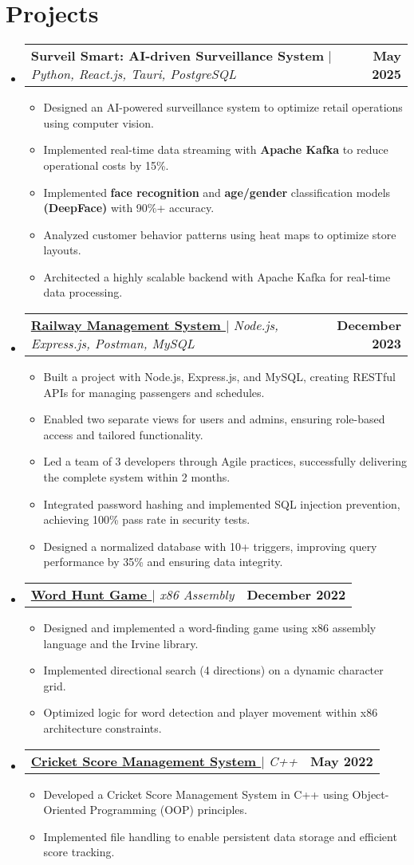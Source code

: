\documentclass[letterpaper,11pt]{article}
\makeatletter
\newcommand{\resumeItem}[1]{
  \item\small{
    {#1 \vspace{-2pt}}
  }
}
\newcommand{\resumeProjectHeading}[2]{
    \item
    \begin{tabular*}{1.001\textwidth}{l@{\extracolsep{\fill}}r}
      \small#1 & \textbf{\small #2}\\
    \end{tabular*}\vspace{-7pt}
}
\newcommand{\sectionspace}{\vspace{-10pt}}
\newcommand{\resumeSubHeadingListStart}{\begin{itemize}[leftmargin=0.0in, label={}]}
\newcommand{\resumeSubHeadingListEnd}{\end{itemize}}
\newcommand{\resumeItemListStart}{\begin{itemize}}
\newcommand{\resumeItemListEnd}{\end{itemize}\vspace{-5pt}}
\makeatother
\begin{document}
\section{Projects}
    \vspace{-5pt}
    \resumeSubHeadingListStart
    \resumeProjectHeading
          {\textbf{Surveil Smart: AI-driven Surveillance System} $|$ \emph{Python, React.js, Tauri, PostgreSQL}}{May 2025}
          \resumeItemListStart
            \resumeItem{Designed an AI-powered surveillance system to optimize retail operations using computer vision.}
            \resumeItem{Implemented real-time data streaming with \textbf{Apache Kafka} to reduce operational costs by 15\%.}
            \resumeItem{Implemented \textbf{face recognition} and \textbf{age/gender} classification models \textbf{(DeepFace)} with 90\%+ accuracy.}
            \resumeItem{Analyzed customer behavior patterns using heat maps to optimize store layouts.}
            \resumeItem{Architected a highly scalable backend with Apache Kafka for real-time data processing.}
          \resumeItemListEnd
          \vspace{-13pt}
    \resumeProjectHeading
          {\textbf{\href{https://github.com/mwarsi2784/Railway-Management-System}{Railway Management System {\faGithub} }} $|$ \emph{Node.js, Express.js, Postman, MySQL}}{December 2023}
          \resumeItemListStart
            \resumeItem{Built a project with Node.js, Express.js, and MySQL, creating RESTful APIs for managing passengers and schedules.}
            \resumeItem{Enabled two separate views for users and admins, ensuring role-based access and tailored functionality.}
            \resumeItem{Led a team of 3 developers through Agile practices, successfully delivering the complete system within 2 months.}
            \resumeItem{Integrated password hashing and implemented SQL injection prevention, achieving 100\% pass rate in security tests.}
            \resumeItem{Designed a normalized database with 10+ triggers, improving query performance by 35\% and ensuring data integrity.}
          \resumeItemListEnd 
          \vspace{-13pt}   
    \resumeProjectHeading
          {\textbf{\href{https://github.com/mwarsi2784/Word_Hunt_Game}{Word Hunt Game {\faGithub}}} $|$ \emph{x86 Assembly}}{December 2022}
          \resumeItemListStart
            \resumeItem{Designed and implemented a word-finding game using x86 assembly language and the Irvine library.}
            \resumeItem{Implemented directional search (4 directions) on a dynamic character grid.}
            \resumeItem{Optimized logic for word detection and player movement within x86 architecture constraints.}
          \resumeItemListEnd
          \vspace{-13pt}    
    \resumeProjectHeading
          {\textbf{\href{https://github.com/mwarsi2784/Cricket-Score-Management-System}{Cricket Score Management System {\faGithub}}} $|$ \emph{C++}}{May 2022}
          \resumeItemListStart
            \resumeItem{Developed a Cricket Score Management System in C++ using Object-Oriented Programming (OOP) principles.}
            \resumeItem{Implemented file handling to enable persistent data storage and efficient score tracking.}
          \resumeItemListEnd   
    \resumeSubHeadingListEnd
\sectionspace
\end{document}
